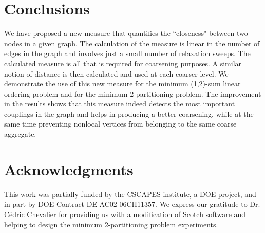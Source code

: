 \documentclass[final]{siamltex}
\begin{document}
\section{Conclusions}
We have proposed a new measure that quantifies the ``closeness" between two nodes in a given graph. The calculation of the measure is linear in the number of edges in the graph and involves just a small number of relaxation sweeps. The calculated measure is all that is required for coarsening purposes. A similar notion of distance is then calculated and used at each coarser level. We demonstrate the use of this new measure for the minimum (1,2)-sum
linear ordering problem and for the minimum 2-partitioning problem. The improvement in the results shows that this measure indeed detects the most important couplings in the graph and helps in producing a better coarsening, while at the same time preventing nonlocal vertices from belonging to the same coarse aggregate.


\section*{Acknowledgments}
This work was partially funded by the CSCAPES institute, a DOE project, and in part by DOE Contract DE-AC02-06CH11357. We express our gratitude to Dr. C\'edric Chevalier for providing us with a modification of Scotch software and helping to design the minimum 2-partitioning problem experiments.


\vspace*{1cm}
\end{document}
